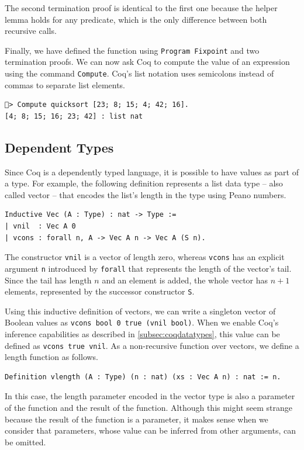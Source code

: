 \documentclass[a4paper, 11pt, fleqn, twoside, abstract=on]{scrreprt}
\newcommand{\cinl}[1]{\texttt{#1}}
\begin{document}
The second termination proof is identical to the first one because the helper lemma holds for any predicate, which is the only difference between both recursive calls.

Finally, we have defined the function using \cinl{Program Fixpoint} and two termination proofs.
We can now ask Coq to compute the value of an expression using the command \cinl{Compute}.
Coq's list notation uses semicolons instead of commas to separate list elements.

\begin{verbatim}
🐔> Compute quicksort [23; 8; 15; 4; 42; 16].
[4; 8; 15; 16; 23; 42] : list nat
\end{verbatim}

\subsection{Dependent Types}
\label{subsec:dependent}

Since Coq is a dependently typed language, it is possible to have values as part of a type.
For example, the following definition represents a list data type -- also called vector -- that encodes the list's length in the type using Peano numbers.

\begin{verbatim}
Inductive Vec (A : Type) : nat -> Type :=
| vnil  : Vec A 0
| vcons : forall n, A -> Vec A n -> Vec A (S n).
\end{verbatim}

The constructor \cinl{vnil} is a vector of length zero, whereas \cinl{vcons} has an explicit argument \cinl{n} introduced by \cinl{forall} that represents the length of the vector's tail.
Since the tail has length $n$ and an element is added, the whole vector has $n + 1$ elements, represented by the successor constructor \cinl{S}.

Using this inductive definition of vectors, we can write a singleton vector of Boolean values as \cinl{vcons bool 0 true (vnil bool)}.
When we enable Coq's inference capabilities as described in \autoref{subsec:coqdatatypes}, this value can be defined as \cinl{vcons true vnil}.
As a non-recursive function over vectors, we define a length function as follows.

\begin{verbatim}
Definition vlength (A : Type) (n : nat) (xs : Vec A n) : nat := n.
\end{verbatim}
\noindent
In this case, the length parameter encoded in the vector type is also a parameter of the function and the result of the function.
Although this might seem strange because the result of the function is a parameter, it makes sense when we consider that parameters, whose value can be inferred from other arguments, can be omitted.
\end{document}

